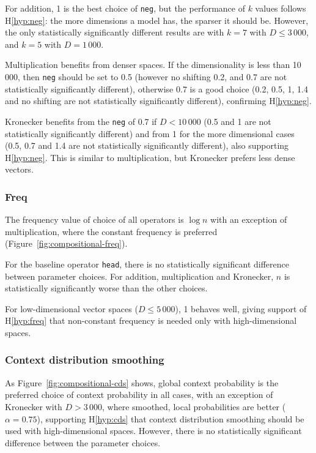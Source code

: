 For addition, 1 is the best choice of \texttt{neg}, but the performance of $k$ values follows H\ref{hyp:neg}: the more dimensions a model has, the sparser it should be. However, the only statistically significantly different results are with $k=7$ with $D \le 3\,000$, and $k=5$ with $D = 1\,000$.

Multiplication benefits from denser spaces. If the dimensionality is less than 10\,000, then \texttt{neg} should be set to 0.5 (however no shifting 0.2, and 0.7 are not statistically significantly different), otherwise 0.7 is a good choice (0.2, 0.5, 1, 1.4 and no shifting are not statistically significantly different), confirming H\ref{hyp:neg}.

Kronecker benefits from the \texttt{neg} of 0.7 if $D < 10\,000$ (0.5 and 1 are not statistically significantly different) and from 1 for the more dimensional cases (0.5, 0.7 and 1.4 are not statistically significantly different), also supporting H\ref{hyp:neg}. This is similar to multiplication, but Kronecker prefers less dense vectors.



\subsubsection{Freq}
\label{sec:freq-compositional}

The frequency value of choice of all operators is $\log n$ with an exception of multiplication, where the constant frequency is preferred (Figure~\ref{fig:compositional-freq}).

For the baseline operator \texttt{head}, there is no statistically significant difference between parameter choices. For addition, multiplication and Kronecker, $n$ is statistically significantly worse than the other choices.

For low-dimensional vector spaces ($D \leq 5\,000$), 1 behaves well, giving support of H\ref{hyp:freq} that non-constant frequency is needed only with high-dimensional spaces.

\subsubsection{Context distribution smoothing}
\label{sec:cont-distr-smooth-compositional}

As Figure~\ref{fig:compositional-cds} shows, global context probability is the preferred choice of context probability in all cases, with an exception of Kronecker with $D > 3\,000$, where smoothed, local probabilities are better ($\alpha = 0.75$), supporting H\ref{hyp:cds} that context distribution smoothing should be used with high-dimensional spaces. However, there is no statistically significant difference between the parameter choices.

